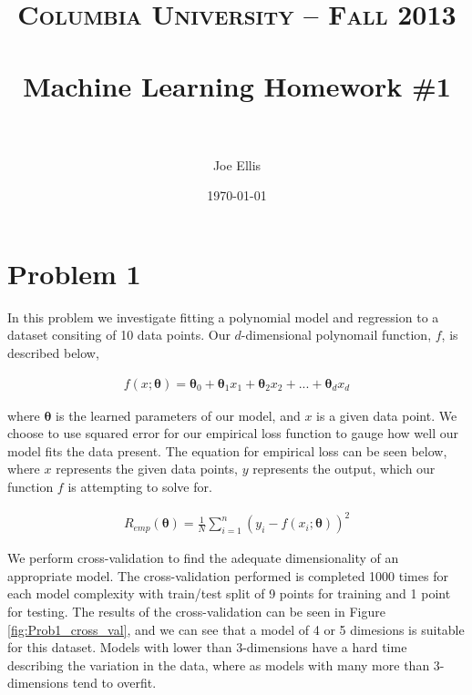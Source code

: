 \documentclass[paper=a4, fontsize=11pt]{scrartcl} %
\title{	
\normalfont \normalsize 
\textsc{Columbia University -- Fall 2013} \\ [25pt] %
\horrule{0.5pt} \\[0.4cm] %
\huge Machine Learning Homework \#1\\ %
\horrule{2pt} \\[0.5cm] %
}
\author{Joe Ellis} %
\date{\normalsize\today} %
\begin{document}
\maketitle %


\section{Problem 1}

In this problem we investigate fitting a polynomial model and regression to a dataset consiting of 10 data points.  
Our $d$-dimensional polynomail function, $f$, is described below, 

\begin{align} 
f(x;\bm{\theta}) = \bm{\theta}_{0}	+ \bm{\theta}_{1}x_{1} + \bm{\theta}_{2}x_{2} + ... + \bm{\theta}_{d}x_{d}		
\end{align}

where $\bm{\theta}$ is the learned parameters of our model, and $x$ is a given data point.
We choose to use squared error for our empirical loss function to gauge how well our model fits the data present.  The equation for empirical loss can be seen below, where $x$ represents the given data points, $y$ represents the output, which our function $f$ is attempting to solve for.

\begin{align} 
R_{emp}(\bm{\theta}) = \frac{1}{N}\sum\limits_{i=1}^n (y_{i} - f(x_{i};\bm{\theta}))^{2}
\end{align}

We perform cross-validation to find the adequate dimensionality of an appropriate model.  
The cross-validation performed is completed 1000 times for each model complexity with train/test split of 9 points for training and 1 point for testing.  The results of the cross-validation can be seen in Figure \ref{fig:Prob1_cross_val}, and we can see that a model of 4 or 5 dimesions is suitable for this dataset.  Models with lower than 3-dimensions have a hard time describing the variation in the data, where as models with many more than 3-dimensions tend to overfit.
\end{document}
